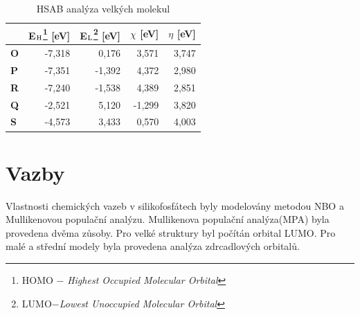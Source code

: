 \documentclass[
  digital, %
  table,   %
  lof,     %
  lot,     %
  oneside,
]{fithesis3}
\renewcommand{\thesubfigure}{}
\begin{document}
\begin{table}[htbp]
\begin{minipage}{\textwidth}
\caption{HSAB analýza velkých molekul}
\begin{center}
\begin{tabular}{|l|r|r|r|r|}
\hline
\label{hsab_large} & E$_{\ce{H}}$\footnote{HOMO $-$ \textit{Highest Occupied Molecular Orbital}} [eV] & E$_{\ce{L}}$\footnote{LUMO$ - $\textit{Lowest Unoccupied Molecular Orbital}} [eV]& $\chi$ [eV] & $\eta$ [eV] \\ \hline
\textbf{O} & -7,318 & 0,176 & 3,571 & 3,747 \\ \hline
\textbf{P} & -7,351 & -1,392 & 4,372 & 2,980 \\ \hline
\textbf{R} & -7,240 & -1,538 & 4,389 & 2,851 \\ \hline
\textbf{Q} & -2,521 & 5,120 & -1,299 & 3,820 \\ \hline
\textbf{S} & -4,573 & 3,433 & 0,570 & 4,003 \\ \hline
\end{tabular}
\end{center}
\end{minipage}
\end{table}





\section{Vazby}
\renewcommand{\thesubfigure}{(\alph{subfigure})}
Vlastnosti chemických vazeb v silikofosfátech byly modelovány metodou NBO a Mullikenovou populační analýzu. Mullikenova populační analýza(MPA) byla provedena dvěma zůsoby. Pro velké struktury byl počítán orbital LUMO. Pro malé a střední modely byla provedena analýza zdrcadlových orbitalů. \\
\end{document}
